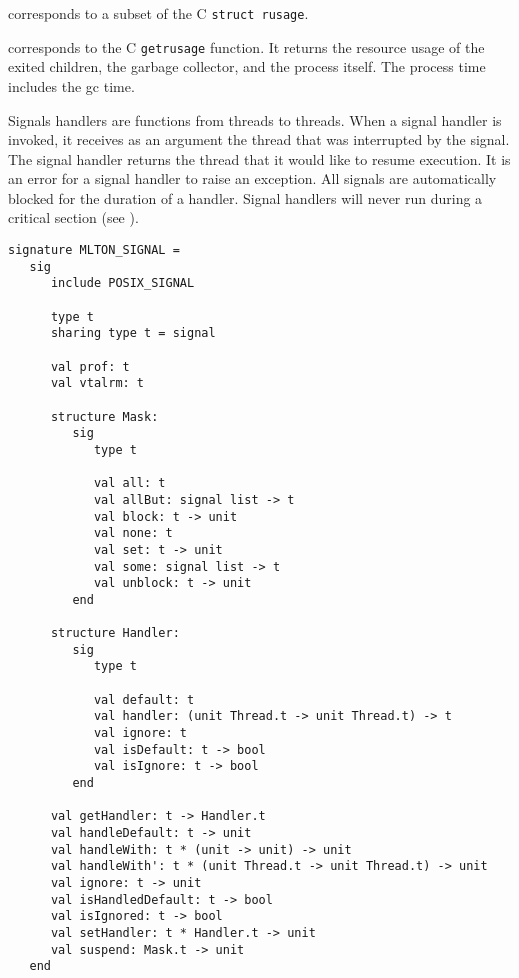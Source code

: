 \begin{description}
corresponds to a subset of the C {\tt struct rusage}.

corresponds to the C {\tt getrusage} function.  It returns the resource usage of
the exited children, the garbage collector, and the process itself.  The process
time includes the gc time.
\end{description}

Signals handlers are functions from threads to threads.  When a signal 
handler is invoked, it receives as an argument the thread that was
interrupted by the signal.  The signal handler returns the thread that 
it would like to resume execution.  It is an error for a signal
handler to raise an exception.  All signals are automatically blocked
for the duration of a handler.  Signal handlers will never run during
a critical section (see ).

\begin{verbatim}
signature MLTON_SIGNAL =
   sig
      include POSIX_SIGNAL

      type t
      sharing type t = signal

      val prof: t
      val vtalrm: t

      structure Mask:
         sig
            type t
               
            val all: t
            val allBut: signal list -> t
            val block: t -> unit
            val none: t
            val set: t -> unit
            val some: signal list -> t
            val unblock: t -> unit
         end

      structure Handler:
         sig
            type t

            val default: t
            val handler: (unit Thread.t -> unit Thread.t) -> t
            val ignore: t
            val isDefault: t -> bool
            val isIgnore: t -> bool
         end

      val getHandler: t -> Handler.t
      val handleDefault: t -> unit
      val handleWith: t * (unit -> unit) -> unit
      val handleWith': t * (unit Thread.t -> unit Thread.t) -> unit
      val ignore: t -> unit
      val isHandledDefault: t -> bool
      val isIgnored: t -> bool
      val setHandler: t * Handler.t -> unit
      val suspend: Mask.t -> unit
   end
\end{verbatim}

